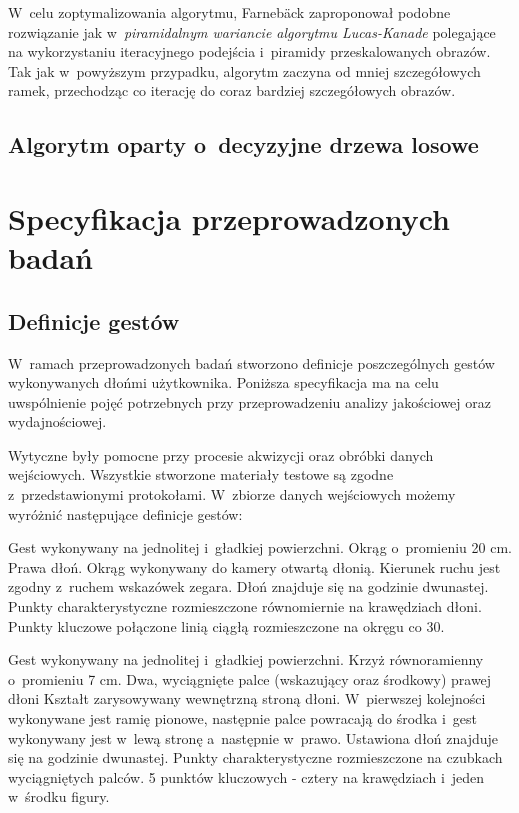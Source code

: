     W~celu zoptymalizowania algorytmu, Farnebäck zaproponował podobne rozwiązanie jak w~\textit{piramidalnym wariancie algorytmu Lucas-Kanade} polegające na wykorzystaniu iteracyjnego podejścia i~piramidy przeskalowanych obrazów. Tak jak w~powyższym przypadku, algorytm zaczyna od mniej szczegółowych ramek, przechodząc co iterację do coraz bardziej szczegółowych obrazów.

  \section{Algorytm oparty o~decyzyjne drzewa losowe}\label{Subsection_RandomizedTrees}
    \cite{RandomizedTrees06}
    \cite{TwoStageRandomizedTrees11}
    \cite{RealTimeRandomizedTrees05}

\chapter{Specyfikacja przeprowadzonych badań}\label{Chapter_SpecyfikacjaPrzeprowadzonychBadan}

  \section{Definicje gestów}\label{Section_DefinicjeGestow}

    W~ramach przeprowadzonych badań stworzono definicje poszczególnych gestów wykonywanych dłońmi użytkownika. Poniższa specyfikacja ma na celu uwspólnienie pojęć potrzebnych przy przeprowadzeniu analizy jakościowej oraz wydajnościowej.

    Wytyczne były pomocne przy procesie akwizycji oraz obróbki danych wejściowych. Wszystkie stworzone materiały testowe są zgodne z~przedstawionymi protokołami. W~zbiorze danych wejściowych możemy wyróżnić następujące definicje gestów:

         {Gest wykonywany na jednolitej i~gładkiej powierzchni.}
         {Okrąg o~promieniu 20 cm.}
         {Prawa dłoń.}
         {Okrąg wykonywany do kamery otwartą dłonią.}
         {Kierunek ruchu jest zgodny z~ruchem wskazówek zegara.}
         {Dłoń znajduje się na godzinie dwunastej.}
         {Punkty charakterystyczne rozmieszczone równomiernie na krawędziach dłoni.}
         {Punkty kluczowe połączone linią ciągłą rozmieszczone na okręgu co 30\degree.}

    \newpage
         {Gest wykonywany na jednolitej i~gładkiej powierzchni.}
         {Krzyż równoramienny o~promieniu 7 cm.}
         {Dwa, wyciągnięte palce (wskazujący oraz środkowy) prawej dłoni}
         {Kształt zarysowywany wewnętrzną stroną dłoni.}
         {W~pierwszej kolejności wykonywane jest ramię pionowe, następnie palce powracają do środka i~gest wykonywany jest w~lewą stronę a~następnie w~prawo.}
         {Ustawiona dłoń znajduje się na godzinie dwunastej.}
         {Punkty charakterystyczne rozmieszczone na czubkach wyciągniętych palców.}
         {5 punktów kluczowych - cztery na krawędziach i~jeden w~środku figury.}

